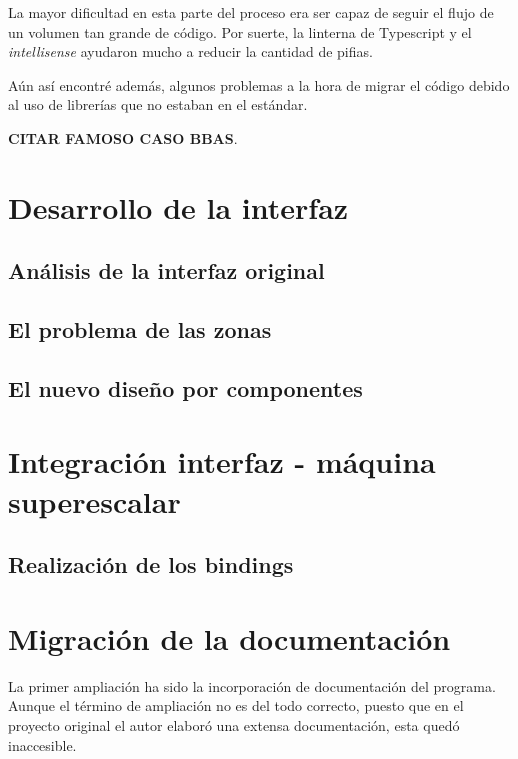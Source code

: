 \bigskip
La mayor dificultad en esta parte del proceso era ser capaz de seguir el flujo de un volumen tan grande
de código. Por suerte, la linterna de Typescript y el \textit{intellisense} ayudaron mucho a reducir la cantidad
de pifias.

\bigskip
Aún así encontré además, algunos problemas a la hora de migrar el código debido al uso de librerías 
que no estaban en el estándar.

\textbf{CITAR FAMOSO CASO BBAS}.

\section{Desarrollo de la interfaz}
\label{5:sec3} 

\subsection{Análisis de la interfaz original}

\subsection{El problema de las zonas}

\subsection{El nuevo diseño por componentes}

\section{Integración interfaz - máquina superescalar}
\label{5:sec4} 

\subsection{Realización de los bindings}

\section{Migración de la documentación}
\label{5:sec5} 

La primer ampliación ha sido la incorporación de documentación del programa. Aunque el
término de ampliación no es del todo correcto, puesto que en el proyecto original el autor
elaboró una extensa documentación, esta quedó inaccesible.

